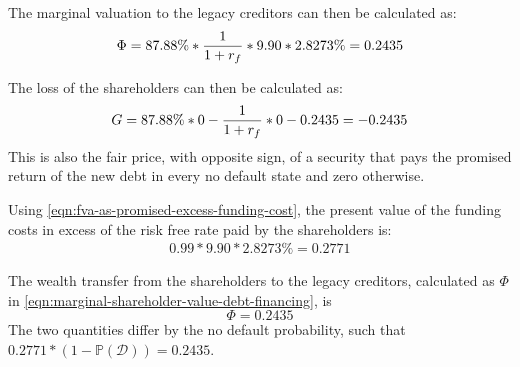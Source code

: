 \documentclass[main.tex]{subfiles}
\begin{document}
        The marginal valuation to the legacy creditors can then be calculated as:
        \begin{equation}
            \Phi 
            = 87.88\% * \frac{1}{1+r_{f}}  * 9.90 * 2.8273\% 
            = 0.2435
        \end{equation}

        The loss of the shareholders can then be calculated as: 
            \begin{align}
                G = 87.88\%*0 - \frac{1}{1+r_{f}} * 0 - 0.2435 = -0.2435
            \end{align}
        This is also the fair price, with opposite sign, 
        of a security that pays the promised return of the new debt in every no default state and zero otherwise. 

        Using \cref{eqn:fva-as-promised-excess-funding-cost}, the present value of the funding costs 
        in excess of the risk free rate paid by the shareholders is: 
        \begin{align}
            0.99 * 9.90 * 2.8273\% = 0.2771
        \end{align}

        The wealth transfer from the shareholders to the legacy creditors, 
        calculated as $\Phi$ in \cref{eqn:marginal-shareholder-value-debt-financing}, is
        \begin{equation}
            \Phi = 0.2435
        \end{equation}
        The two quantities differ by the no default probability, such that 
        $0.2771 * (1-\mathbb{P}\left(\mathcal{D}\right)) = 0.2435$.
\end{document}
